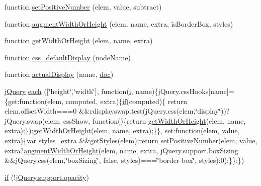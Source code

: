 \begin{DoxyCompactItemize}
\item 
function \hyperlink{_scripts_2jquery-1_810_82_8js_a049182834e8b4b2d7485cd919ed272d7}{set\+Positive\+Number} (elem, value, subtract)
\item 
function \hyperlink{_scripts_2jquery-1_810_82_8js_aacaac1f0b5ea53030522e6f5b227ce51}{augment\+Width\+Or\+Height} (elem, name, extra, is\+Border\+Box, styles)
\item 
function \hyperlink{_scripts_2jquery-1_810_82_8js_a6520fbbeac78eeb0f519393470dc873b}{get\+Width\+Or\+Height} (elem, name, extra)
\item 
function \hyperlink{_scripts_2jquery-1_810_82_8js_a90f91be23732240774f2a323d500c78a}{css\+\_\+default\+Display} (node\+Name)
\item 
function \hyperlink{_scripts_2jquery-1_810_82_8js_a88bc5a80e40ccc594ece17ae5772d5d3}{actual\+Display} (name, \hyperlink{_scripts_2respond_8js_a8375eceb3a4b59a36700e7fc468e8983}{doc})
\item 
\hyperlink{_scripts_2jquery-1_810_82_8js_a41c2e1bff4a6b292938143764e31d789}{j\+Query} \hyperlink{_scripts_2jquery-1_810_82_8js_af7620627e2f905064d3dff5102ed804b}{each} (\mbox{[}\char`\"{}height\char`\"{},\char`\"{}width\char`\"{}\mbox{]}, function(\hyperlink{_scripts_2respond_8min_8js_a5e25b1d1bed9ab5f3174b76d6a722180}{i}, name)\{j\+Query.\+css\+Hooks\mbox{[}name\mbox{]}=\{get\+:function(elem, computed, extra)\{\hyperlink{_scripts_2respond_8min_8js_a93851d60dd037a83509a1757b9ee7b66}{if}(computed)\{   return elem.\+offset\+Width===0 \&\&rdisplayswap.\+test(j\+Query.\+css(elem,\char`\"{}display\char`\"{}))?j\+Query.\+swap(elem, css\+Show, function()\{return \hyperlink{_scripts_2jquery-1_810_82_8js_a6520fbbeac78eeb0f519393470dc873b}{get\+Width\+Or\+Height}(elem, name, extra);\})\+:\hyperlink{_scripts_2jquery-1_810_82_8js_a6520fbbeac78eeb0f519393470dc873b}{get\+Width\+Or\+Height}(elem, name, extra);\}\}, set\+:function(elem, value, extra)\{var styles=extra \&\&get\+Styles(elem);return \hyperlink{_scripts_2jquery-1_810_82_8js_a049182834e8b4b2d7485cd919ed272d7}{set\+Positive\+Number}(elem, value, extra?\hyperlink{_scripts_2jquery-1_810_82_8js_aacaac1f0b5ea53030522e6f5b227ce51}{augment\+Width\+Or\+Height}(elem, name, extra, j\+Query.\+support.\+box\+Sizing \&\&j\+Query.\+css(elem,\char`\"{}box\+Sizing\char`\"{}, false, styles)===\char`\"{}border-\/box\char`\"{}, styles)\+:0);\}\};\})
\item 
\hyperlink{_scripts_2jquery-1_810_82_8js_abc7375d3165b805c35ce8ca2e1a31e81}{if} (!\hyperlink{_scripts_2jquery-1_810_82_8min_8js_a328c19d9255bfd09a2f3cddecadca6ad}{j\+Query.\+support.\+opacity})

\end{DoxyCompactItemize}
